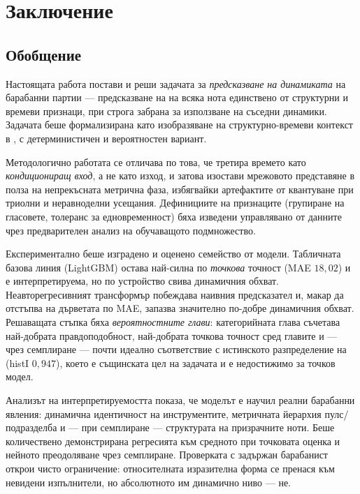 \chapter{Заключение}
\label{ch:zaklyuchenie}

\section{Обобщение}
\label{sec:obobshtenie}

Настоящата работа постави и реши задачата за \emph{предсказване на динамиката} на
барабанни партии — предсказване на  на всяка нота единствено от
структурни и времеви признаци, при строга забрана за използване на съседни
динамики. Задачата беше формализирана като изобразяване на структурно-времеви
контекст в , с детерминистичен и вероятностен вариант.

Методологично работата се отличава по това, че третира времето като
\emph{кондициониращ вход}, а не като изход, и затова изостави мрежовото представяне
в полза на непрекъсната метрична фаза, избягвайки артефактите от квантуване при
триолни и неравноделни усещания. Дефинициите на признаците (групиране на
гласовете, толеранс за едновременност) бяха изведени управлявано от данните чрез
предварителен анализ на обучаващото подмножество.

Експериментално беше изградено и оценено семейство от модели. Табличната базова
линия (LightGBM) остава най-силна по \emph{точкова} точност (MAE $18{,}02$) и е
интерпретируема, но по устройство свива динамичния обхват. Неавторегресивният
трансформър побеждава наивния предсказател и, макар да отстъпва на дърветата по
MAE, запазва значително по-добре динамичния обхват. Решаващата стъпка бяха
\emph{вероятностните глави}: категорийната глава съчетава най-добрата
правдоподобност, най-добрата точкова точност сред главите и — чрез семплиране —
почти идеално съответствие с истинското разпределение на 
(histI $0{,}947$), което е същинската цел на задачата и е недостижимо за
точков модел.

Анализът на интерпретируемостта показа, че моделът е научил реални барабанни
явления: динамична идентичност на инструментите, метричната йерархия пулс/подразделба
и — при семплиране — структурата на призрачните ноти. Беше количествено
демонстрирана регресията към средното при точковата оценка и нейното преодоляване
чрез семплиране. Проверката с задържан барабанист открои чисто ограничение:
относителната изразителна форма се пренася към невидени изпълнители, но абсолютното
им динамично ниво — не.

